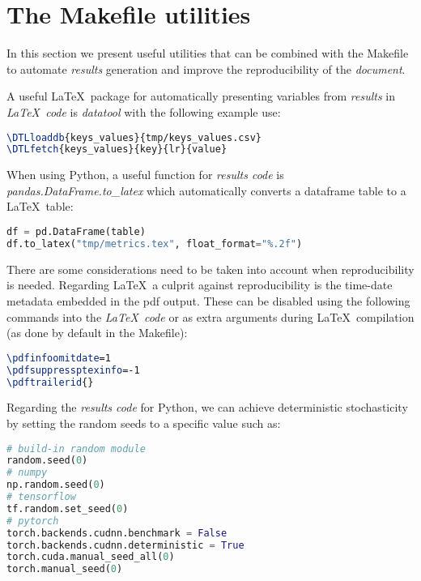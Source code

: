 \documentclass[journal]{IEEEtran}
\begin{document}
\section{The Makefile utilities}
In this section we present useful utilities that can be combined with the Makefile to automate \textit{results} generation and improve the reproducibility of the \textit{document}.

A useful \LaTeX\ package for automatically presenting variables from \textit{results} in \textit{\LaTeX\ code} is \textit{datatool} with the following example use:
\begin{lstlisting}[language=TeX, style=lststyle, caption={\LaTeX\ datatool example of loading a file that contains pairs of keys and values (tmp/keys\_values.csv) generated by a \textit{results code} and getting the value of a key named lr.}]
\DTLloaddb{keys_values}{tmp/keys_values.csv}
\DTLfetch{keys_values}{key}{lr}{value}
\end{lstlisting}

When using Python, a useful function for \textit{results code} is \textit{pandas.DataFrame.to\_latex} which automatically converts a dataframe table to a \LaTeX\ table:
\begin{lstlisting}[language=python, style=lststyle, caption={Convert Pandas DataFrame (df) to \LaTeX\ table (tmp/metrics.tex) in \textit{results code}.}]
df = pd.DataFrame(table)
df.to_latex("tmp/metrics.tex", float_format="%.2f")
\end{lstlisting}

There are some considerations need to be taken into account when reproducibility is needed.
Regarding \LaTeX\, a culprit against reproducibility is the time-date metadata embedded in the pdf output.
These can be disabled using the following commands into the \textit{\LaTeX\ code} or as extra arguments during \LaTeX\ compilation (as done by default in the Makefile):
\begin{lstlisting}[language=TeX, style=lststyle, caption={\LaTeX\ pdf reproducibility commands.}]
\pdfinfoomitdate=1
\pdfsuppressptexinfo=-1
\pdftrailerid{}
\end{lstlisting}

Regarding the \textit{results code} for Python, we can achieve deterministic stochasticity by setting the random seeds to a specific value such as:
\begin{lstlisting}[language=python, style=lststyle, caption={Python reproducibility commands for popular libraries.}]
# build-in random module
random.seed(0)
# numpy
np.random.seed(0)
# tensorflow
tf.random.set_seed(0)
# pytorch
torch.backends.cudnn.benchmark = False
torch.backends.cudnn.deterministic = True
torch.cuda.manual_seed_all(0)
torch.manual_seed(0)
\end{lstlisting}
\end{document}
